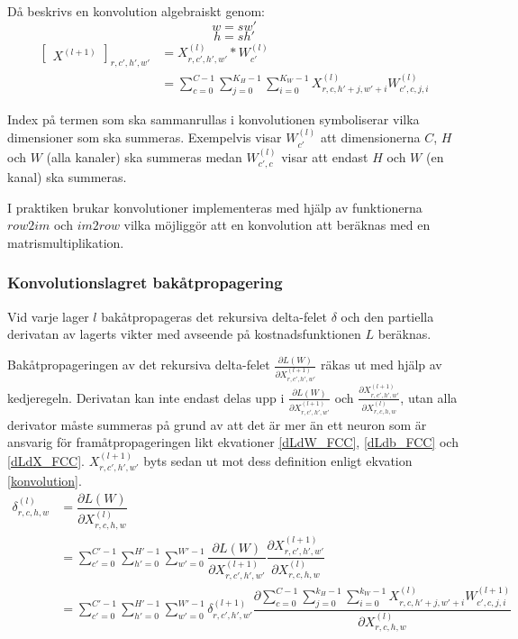 \documentclass[a4paper,11pt,twoside]{article}
\newcommand*{\pd}[2]{\ensuremath{\dfrac{\partial #1}{\partial #2}}}
\newcommand*{\inpd}[2]{\ensuremath{\frac{\partial #1}{\partial #2}}}
\begin{document}
Då beskrivs en konvolution algebraiskt genom: \cite{cs231n} \cite{convmath}
\begin{equation}
w = sw'
\end{equation}
\begin{equation}
h = sh'
\end{equation}
\begin{equation}\label{konvolution}
\begin{split}
	\begin{bmatrix} X^{(l+1)} \end{bmatrix}_{r, c', h', w'}	
		& = X^{(l)}_{r, c', h', w'} *W^{(l)}_{c'} \\
		& = \sum^{C-1}_{c=0} \sum^{K_H-1}_{j=0} \sum^{K_W-1}_{i=0} X^{(l)}_{r, c, h'+j, w'+i}W^{(l)}_{c', c, j, i}
\end{split}
\end{equation}

Index på termen som ska sammanrullas i konvolutionen symboliserar vilka dimensioner som ska summeras. Exempelvis visar $W^{(l)}_{c'}$ att dimensionerna $C$, $H$ och $W$ (alla kanaler) ska summeras medan  $W^{(l)}_{c', c}$ visar att endast $H$ och $W$ (en kanal) ska summeras.

I praktiken brukar konvolutioner implementeras med hjälp av funktionerna $row2im$ och $im2row$ vilka möjliggör att en konvolution att beräknas med en matrismultiplikation. \cite{cs231n} \cite{convmath} \cite{convarithmetic}

\subsubsection{Konvolutionslagret bakåtpropagering}
Vid varje lager $l$ bakåtpropageras det rekursiva delta-felet $\delta$ och den partiella derivatan av lagerts vikter med avseende på kostnadsfunktionen $L$ beräknas. 

Bakåtpropageringen av det rekursiva delta-felet $\inpd{L(W)}{X^{(l+1)}_{r,c',h',w'}}$ räkas ut med hjälp av kedjeregeln. Derivatan kan inte endast delas upp i $\inpd{L(W)}{X^{(l+1)}_{r,c',h',w'}}$ och $\inpd{X^{(l+1)}_{r,c',h',w'}}{X^{(l)}_{r,c,h,w}}$, utan alla derivator måste summeras på grund av att det är mer än ett neuron som är ansvarig för framåtpropageringen likt ekvationer \eqref{dLdW_FCC}, \eqref{dLdb_FCC} och \eqref{dLdX_FCC}. $X^{(l+1)}_{r,c',h',w'}$ byts sedan ut mot dess definition enligt ekvation \eqref{konvolution}. \cite{convmath} \cite{webconv1} \cite{webconv2} \cite{webconv3}
\begin{equation}\label{konvolutionbackprop}
\begin{split}
	\delta^{(l)}_{r,c,h,w}
		& = \pd{L(W)}{X^{(l)}_{r,c,h,w}} \\
		& = \sum^{C'-1}_{c'=0} \sum^{H'-1}_{h'=0} \sum^{W'-1}_{w'=0} \pd{L(W)}{X^{(l+1)}_{r,c',h',w'}} \pd{X^{(l+1)}_{r,c',h',w'}}{X^{(l)}_{r,c,h,w}} \\
		& = \sum^{C'-1}_{c'=0} \sum^{H'-1}_{h'=0} \sum^{W'-1}_{w'=0} \delta^{(l+1)}_{r,c',h',w'} \pd{\sum^{C-1}_{c=0} \sum^{k_H-1}_{j=0} \sum^{k_W-1}_{i=0} X^{(l)}_{r, c, h'+j, w'+i}W^{(l+1)}_{c', c, j, i}}{X^{(l)}_{r,c,h,w}}
\end{split}
\end{equation}
\end{document}
